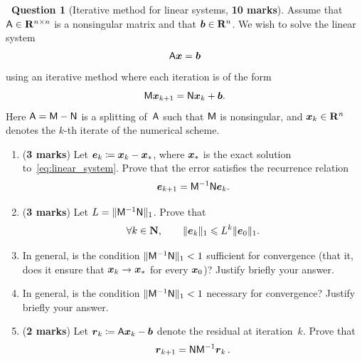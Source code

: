 \documentclass[10pt]{article}
\theoremstyle{definition}
\newtheorem{question}{{\normalfont \faGears}~Question}
\renewcommand{\mymarks}[1]{\textbf{#1 marks}}
\begin{document}
\newpage
\begin{question}
    [Iterative method for linear systems, \textbf{10 marks}]
    Assume that $\mathsf A \in \mathbf R^{n \times n}$ is a nonsingular matrix and that $\mathbf{\boldsymbol{b}} \in \mathbf R^n$.
    We wish to solve the linear system
    \begin{equation}
        \label{eq:linear_system}
        \mathsf A \mathbf{\boldsymbol{x}} = \mathbf{\boldsymbol{b}}
    \end{equation}
    using an iterative method where each iteration is of the form
    \begin{equation}
        \label{eq:iterative_scheme}
        \mathsf M \mathbf{\boldsymbol{x}}_{k+1} = \mathsf N \mathbf{\boldsymbol{x}}_k + \mathbf{\boldsymbol{b}}.
    \end{equation}
    Here $\mathsf A = \mathsf M - \mathsf N$ is a splitting of~$\mathsf A$ such that $\mathsf M$ is nonsingular,
    and $\mathbf{\boldsymbol{x}}_k \in \mathbf R^n$ denotes the $k$-th iterate of the numerical scheme.

    \begin{enumerate}
        \item
            (\mymarks{3})
            Let $\mathbf{\boldsymbol{e}}_k \coloneq \mathbf{\boldsymbol{x}}_k - \mathbf{\boldsymbol{x}}_*$,
            where $\mathbf{\boldsymbol{x}}_*$ is the exact solution to~\eqref{eq:linear_system}.
            Prove that the error satisfies the recurrence relation
            \[
                \mathbf{\boldsymbol{e}}_{k+1} = \mathsf M^{-1} \mathsf N \mathbf{\boldsymbol{e}}_k.
            \]
            \vspace{5cm}

        \item
            (\mymarks{3})
            Let $L = \lVert\mathsf M^{-1} \mathsf N\rVert_{1}$.
            Prove that
            \begin{equation}
                \label{eq:inequality_interpolation}
                \forall k \in \mathbf N, \qquad
                \lVert\mathbf{\boldsymbol{e}}_k\rVert_{1} \leqslant L^k \lVert\mathbf{\boldsymbol{e}}_0\rVert_{1}.
            \end{equation}
            \vspace{6cm}

        \item
            \mymark
            In general, is the condition $\lVert\mathsf M^{-1} \mathsf N\rVert_{1} < 1$ sufficient
            for convergence (that it, does it ensure that $\mathbf{\boldsymbol{x}}_k \to \mathbf{\boldsymbol{x}}_*$ for every $\mathbf{\boldsymbol{x}}_0$)?
            Justify briefly your answer.
            \vspace{3cm}

        \item
            \mymark
            In general, is the condition $\lVert\mathsf M^{-1} \mathsf N\rVert_{1} < 1$ necessary for convergence?
            Justify briefly your answer.
            \vspace{3cm}

        \item
            (\textbf{2 marks})
            Let $\mathbf{\boldsymbol{r}}_k \coloneq \mathsf A \mathbf{\boldsymbol{x}}_k - \mathbf{\boldsymbol{b}}$ denote the residual at iteration~$k$.
            Prove that
            \[
                \mathbf{\boldsymbol{r}}_{k+1} = \mathsf N \mathsf M^{-1} \mathbf{\boldsymbol{r}}_k \, .
            \]
    \end{enumerate}
\end{question}
\end{document}
